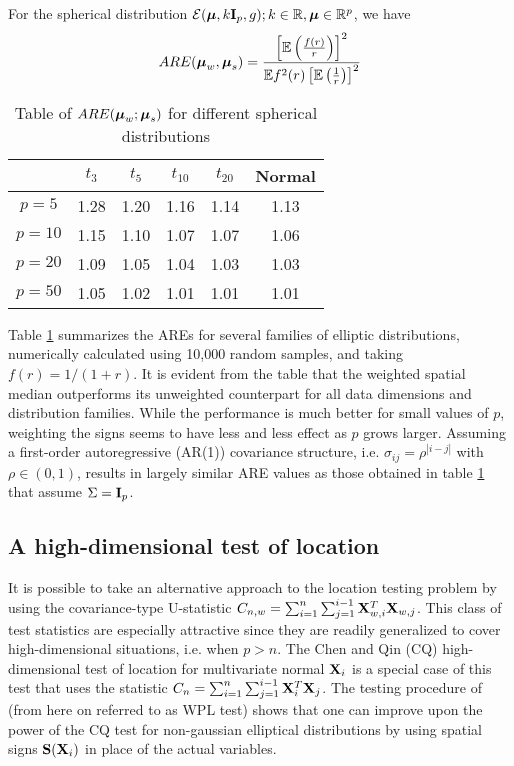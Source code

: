 \begin{Corollary}
For the spherical distribution $\mathcal{E}({\boldsymbol{\mu}}, k {\mathbf{I}}_p, g); k \in \mathbb R, {\boldsymbol{\mu}} \in \mathbb R^p$, we have
%
$$
ARE( {\boldsymbol{\mu}}_w, {\boldsymbol{\mu}}_s) = \frac{ \left[ {\mathbb{E}} \left( \frac{f(r)}{r} \right) \right]^2}{{\mathbb{E}} f^2(r) \left[ {\mathbb{E}} \left( \frac{1}{r} \right) \right]^2 }
$$
\end{Corollary}
%
\begin{table}[t]
	\centering
    \begin{tabular}{c|ccccc}
    \hline
    & $t_3$   & $t_5$   & $t_{10}$  & $t_{20}$  & Normal \\ \hline
    $p=5$    & 1.28 & 1.20 & 1.16 & 1.14 & 1.13   \\
    $p=10$   & 1.15 & 1.10 & 1.07 & 1.07 & 1.06   \\
    $p=20$   & 1.09 & 1.05 & 1.04 & 1.03 & 1.03   \\
    $p=50$   & 1.05 & 1.02 & 1.01 & 1.01 & 1.01   \\ \hline
    \end{tabular}
    \caption{Table of $ARE({\boldsymbol{\mu}}_w; {\boldsymbol{\mu}}_s)$ for different spherical distributions}
    \label{table:AREtablewsm}
\end{table}
%
Table \ref{table:AREtablewsm} summarizes the AREs for several families of elliptic distributions, numerically calculated using 10,000 random samples, and taking $f(r) = 1/(1+r)$. It is evident from the table that the weighted spatial median outperforms its unweighted counterpart for all data dimensions and distribution families. While the performance is much better for small values of $p$, weighting the signs seems to have less and less effect as $p$ grows larger. Assuming a first-order autoregressive (AR(1)) covariance structure, i.e. $\sigma_{ij} = \rho^{|i-j|}$ with $ \rho \in (0,1)$, results in largely similar ARE values as those obtained in table \ref{table:AREtablewsm} that assume $\Sigma = {\mathbf{I}}_p$.

\subsection{A high-dimensional test of location}

It is possible to take an alternative approach to the location testing problem by using the covariance-type U-statistic $C_{n,w} = \sum_{i=1}^n \sum_{j=1}^{i-1} {\mathbf{X}}_{w,i}^T {\mathbf{X}}_{w,j}$. This class of test statistics are especially attractive since they are readily generalized to cover high-dimensional situations, i.e. when $p > n$. The Chen and Qin (CQ) high-dimensional test of location for multivariate normal ${\mathbf{X}}_i$ \citep{ChenQin10} is a special case of this test that uses the statistic $C_n = \sum_{i=1}^n \sum_{j=1}^{i-1} {\mathbf{X}}_i^T {\mathbf{X}}_j$. The testing procedure of \cite{WangPengLi15} (from here on referred to as WPL test) shows that one can improve upon the power of the CQ test for non-gaussian elliptical distributions by using spatial signs ${\mathbf{S}}({\mathbf{X}}_i)$ in place of the actual variables.

